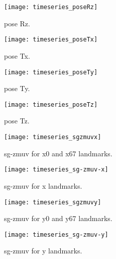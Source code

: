 \documentclass[a4paper,12pt]{article}
\begin{document}
\begin{figure}
\centering
\texttt{[image: timeseries\_poseRz]}
\caption{pose Rz.}
\end{figure}





\begin{figure}
\centering
\texttt{[image: timeseries\_poseTx]}
\caption{pose Tx.}
\end{figure}


\begin{figure}
\centering
\texttt{[image: timeseries\_poseTy]}
\caption{pose Ty.}
\end{figure}


\begin{figure}
\centering
\texttt{[image: timeseries\_poseTz]}
\caption{pose Tz.}
\end{figure}






\begin{figure}
\centering
\texttt{[image: timeseries\_sgzmuvx]}
\caption{sg-zmuv for x0 and x67 landmarks.}
\end{figure}


\begin{figure}
\centering
\texttt{[image: timeseries\_sg-zmuv-x]}
\caption{sg-zmuv for x landmarks.}
\end{figure}


\begin{figure}
\centering
\texttt{[image: timeseries\_sgzmuvy]}
\caption{sg-zmuv for y0 and y67 landmarks.}
\end{figure}


\begin{figure}
\centering
\texttt{[image: timeseries\_sg-zmuv-y]}
\caption{sg-zmuv for y landmarks.}
\end{figure}
\end{document}
